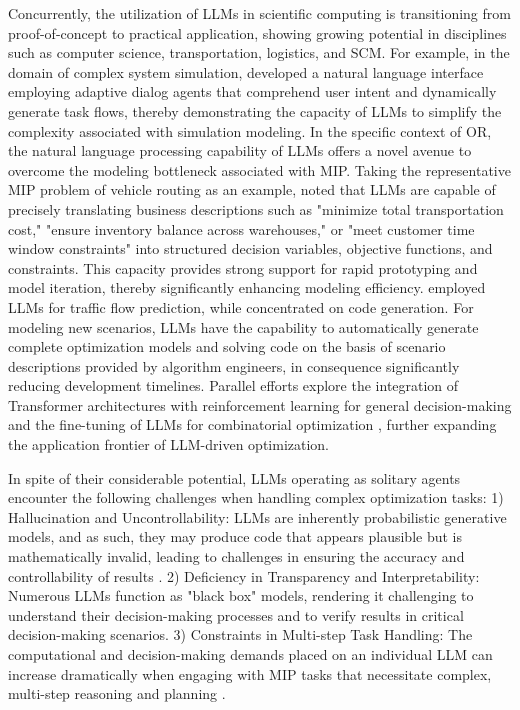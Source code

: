 \documentclass[preprint,12pt]{elsarticle}
\begin{document}
Concurrently, the utilization of LLMs in scientific computing is transitioning from proof-of-concept to practical application, showing growing potential in disciplines such as computer science, transportation, logistics, and SCM. For example, in the domain of complex system simulation, \citet{liAdaptiveTODLLMdrivenAdaptive2025a} developed a natural language interface employing adaptive dialog agents that comprehend user intent and dynamically generate task flows, thereby demonstrating the capacity of LLMs to simplify the complexity associated with simulation modeling. In the specific context of OR, the natural language processing capability of LLMs offers a novel avenue to overcome the modeling bottleneck associated with MIP. Taking the representative MIP problem of vehicle routing as an example, \citet{jiangDROCELEVATINGLARGE2025a} noted that LLMs are capable of precisely translating business descriptions such as "minimize total transportation cost," "ensure inventory balance across warehouses," or "meet customer time window constraints" into structured decision variables, objective functions, and constraints. This capacity provides strong support for rapid prototyping and model iteration, thereby significantly enhancing modeling efficiency. \citet{liuSTLLMGraphEnhanced2025} employed LLMs for traffic flow prediction, while \citet{ishibashiSelfOrganizedAgentsLLM2024} concentrated on code generation. For modeling new scenarios, LLMs have the capability to automatically generate complete optimization models and solving code on the basis of scenario descriptions provided by algorithm engineers, in consequence significantly reducing development timelines. Parallel efforts explore the integration of Transformer architectures with reinforcement learning for general decision-making \citep{yuanTransformerReinforcementLearning2024} and the fine-tuning of LLMs for combinatorial optimization \citep{liMultitypeGameOptimisation2026}, further expanding the application frontier of LLM-driven optimization.

In spite of their considerable potential, LLMs operating as solitary agents encounter the following challenges when handling complex optimization tasks:
1) Hallucination and Uncontrollability: LLMs are inherently probabilistic generative models, and as such, they may produce code that appears plausible but is mathematically invalid, leading to challenges in ensuring the accuracy and controllability of results \citep{huangSurveyHallucinationLarge2025}.
2) Deficiency in Transparency and Interpretability: Numerous LLMs function as "black box" models, rendering it challenging to understand their decision-making processes and to verify results in critical decision-making scenarios.
3) Constraints in Multi-step Task Handling: The computational and decision-making demands placed on an individual LLM can increase dramatically when engaging with MIP tasks that necessitate complex, multi-step reasoning and planning \citep{labanLLMsGetLost2025a}.
\end{document}
